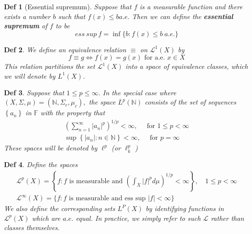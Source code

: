 \documentclass[10pt]{paper}
\newtheorem{definition}{Def}[section]
\begin{document}
\begin{definition}[Essential supremum]
    Suppose that $f$ is a measurable function and there exists a number $b$ such that $f(x) \leq b a.e.$ Then we can define the \textbf{essential supremum} of $f$ to be $$ess \ sup \  f=\inf \{b: f(x) \leq b \  a.e. \}$$
\end{definition}

\begin{definition}
    We define an equivalence relation $\equiv$ on $\mathcal{L}^{1}(X)$ by $$f \equiv g \Longleftrightarrow f(x)=g(x) \text { for a.e. } x \in X$$ This relation partitions the set $\mathcal{L}^{1}(X)$ into a space of equivalence classes, which we will denote by $L^{1}(X)$.
\end{definition}

\begin{definition}
    Suppose that $1 \leq p \leq \infty .$ In the special case where $(X, \Sigma, \mu)=\left(\mathbb{N}, \Sigma_{c}, \mu_{c}\right),$ the space $L^{p}(\mathbb{N})$ consists of the set of sequences $\left\{a_{n}\right\}$ in $\mathbb{F}$ with the property that
    $$
        \begin{array}{l}
            \left(\sum_{n=1}^{\infty}\left|a_{n}\right|^{p}\right)^{1 / p}<\infty, \quad \text { for } 1 \leq p<\infty \\
            \sup \left\{\left|a_{n}\right|: n \in \mathbb{N}\right\}<\infty, \quad \text { for } p=\infty
        \end{array}
    $$
    These spaces will be denoted by $\ell^{p}$ (or $\ell_{k}^{p}$ )
\end{definition}

\begin{definition}
    Define the spaces
    $$
        \begin{array}{l}
            \mathcal{L}^{p}(X)=\left\{f: f \text { is measurable and }\left(\int_{X}|f|^{p} d \mu\right)^{1 / p}<\infty\right\}, \quad 1 \leq p<\infty \\
            \mathcal{L}^{\infty}(X)=\{f: f \text { is measurable and ess sup }|f|<\infty\}
        \end{array}
    $$
    We also define the corresponding sets $L^{P}(X)$ by identifying functions in $\mathcal{L}^{p}(X)$ which are $a.e.$ equal. In practice, we simply refer to such $\mathcal{L}$ rather than classes themselves.
\end{definition}
\end{document}
